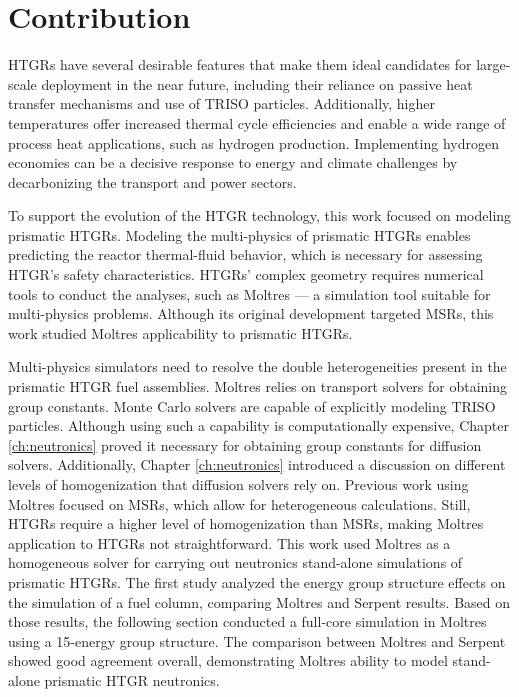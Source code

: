\section{Contribution}

HTGRs have several desirable features that make them ideal candidates for large-scale deployment in the near future, including their reliance on passive heat transfer mechanisms and use of TRISO particles.
Additionally, higher temperatures offer increased thermal cycle efficiencies and enable a wide range of process heat applications, such as hydrogen production.
Implementing hydrogen economies can be a decisive response to energy and climate challenges by decarbonizing the transport and power sectors.

To support the evolution of the HTGR technology, this work focused on modeling prismatic HTGRs.
Modeling the multi-physics of prismatic HTGRs enables predicting the reactor thermal-fluid behavior, which is necessary for assessing HTGR's safety characteristics.
HTGRs' complex geometry requires numerical tools to conduct the analyses, such as Moltres --- a simulation tool suitable for multi-physics problems.
Although its original development targeted MSRs, this work studied Moltres applicability to prismatic HTGRs.

Multi-physics simulators need to resolve the double heterogeneities present in the prismatic HTGR fuel assemblies.
Moltres relies on transport solvers for obtaining group constants.
Monte Carlo solvers are capable of explicitly modeling TRISO particles.
Although using such a capability is computationally expensive, Chapter \ref{ch:neutronics} proved it necessary for obtaining group constants for diffusion solvers.
Additionally, Chapter \ref{ch:neutronics} introduced a discussion on different levels of homogenization that diffusion solvers rely on.
Previous work using Moltres focused on MSRs, which allow for heterogeneous calculations.
Still, HTGRs require a higher level of homogenization than MSRs, making Moltres application to HTGRs not straightforward.
This work used Moltres as a homogeneous solver for carrying out neutronics stand-alone simulations of prismatic HTGRs.
The first study analyzed the energy group structure effects on the simulation of a fuel column, comparing Moltres and Serpent results.
Based on those results, the following section conducted a full-core simulation in Moltres using a 15-energy group structure.
The comparison between Moltres and Serpent showed good agreement overall, demonstrating Moltres ability to model stand-alone prismatic HTGR neutronics.

